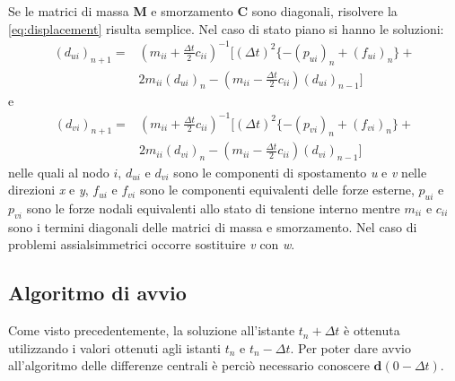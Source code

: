 Se le matrici di massa \textbf{M} e smorzamento \textbf{C} sono diagonali, risolvere la \ref{eq:displacement} risulta semplice. Nel caso di stato piano si hanno le soluzioni:
\begin{equation} 
	\begin{split}
		(d_{ui})_{n+1} = & (m_{ii} + \frac{\varDelta t}{2} c_{ii})^{-1} [(\varDelta t)^2 \{ - (p_{ui})_n + (f_{ui})_n \} + \\ 
		&2 m_{ii} (d_{ui})_n - (m_{ii} - \frac{\varDelta t}{2} c_{ii}) (d_{ui})_{n-1}]
	\end{split}
	\label{eq:dispx} 
\end{equation}
e
\begin{equation} 
	\begin{split}
		(d_{vi})_{n+1} = & (m_{ii} + \frac{\varDelta t}{2} c_{ii})^{-1} [(\varDelta t)^2 \{ - (p_{vi})_n + (f_{vi})_n \} + \\ 
		&2 m_{ii} (d_{vi})_n - (m_{ii} - \frac{\varDelta t}{2} c_{ii}) (d_{vi})_{n-1} ]
	\end{split} 
\end{equation}
nelle quali al nodo $i$, $d_{ui}$ e $d_{vi}$ sono le componenti di spostamento \textit{u} e \textit{v} nelle direzioni \textit{x} e \textit{y}, $f_{ui}$ e $f_{vi}$ sono le componenti equivalenti delle forze esterne,  $p_{ui}$ e $p_{vi}$ sono le forze nodali equivalenti allo stato di tensione interno mentre $m_{ii}$ e $c_{ii}$ sono i termini diagonali delle matrici di massa e smorzamento. Nel caso di problemi assialsimmetrici occorre sostituire \textit{v} con \textit{w}.

\subsection{Algoritmo di avvio}
Come visto precedentemente, la soluzione all'istante $t_n + \varDelta t$ è ottenuta utilizzando i valori ottenuti agli istanti $t_n$ e $t_n - \varDelta t$. Per poter dare avvio all'algoritmo delle differenze centrali è perciò necessario conoscere $\boldsymbol{d}(0-\varDelta t)$.

